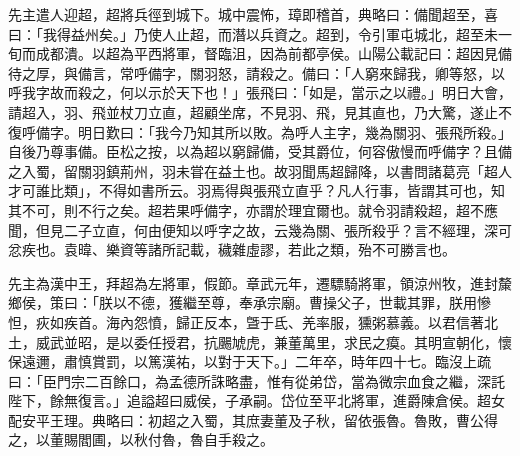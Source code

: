 \begin{pinyinscope}
先主遣人迎超，超將兵徑到城下。城中震怖，璋即稽首，典略曰：備聞超至，喜曰：「我得益州矣。」乃使人止超，而潛以兵資之。超到，令引軍屯城北，超至未一旬而成都潰。以超為平西將軍，督臨沮，因為前都亭侯。山陽公載記曰：超因見備待之厚，與備言，常呼備字，關羽怒，請殺之。備曰：「人窮來歸我，卿等怒，以呼我字故而殺之，何以示於天下也！」張飛曰：「如是，當示之以禮。」明日大會，請超入，羽、飛並杖刀立直，超顧坐席，不見羽、飛，見其直也，乃大驚，遂止不復呼備字。明日歎曰：「我今乃知其所以敗。為呼人主字，幾為關羽、張飛所殺。」自後乃尊事備。臣松之按，以為超以窮歸備，受其爵位，何容傲慢而呼備字？且備之入蜀，留關羽鎮荊州，羽未甞在益土也。故羽聞馬超歸降，以書問諸葛亮「超人才可誰比類」，不得如書所云。羽焉得與張飛立直乎？凡人行事，皆謂其可也，知其不可，則不行之矣。超若果呼備字，亦謂於理宜爾也。就令羽請殺超，超不應聞，但見二子立直，何由便知以呼字之故，云幾為關、張所殺乎？言不經理，深可忿疾也。袁暐、樂資等諸所記載，穢雜虛謬，若此之類，殆不可勝言也。

先主為漢中王，拜超為左將軍，假節。章武元年，遷驃騎將軍，領涼州牧，進封斄鄉侯，策曰：「朕以不德，獲繼至尊，奉承宗廟。曹操父子，世載其罪，朕用慘怛，疢如疾首。海內怨憤，歸正反本，曁于氐、羌率服，獯粥慕義。以君信著北土，威武並昭，是以委任授君，抗颺虓虎，兼董萬里，求民之瘼。其明宣朝化，懷保遠邇，肅慎賞罰，以篤漢祐，以對于天下。」二年卒，時年四十七。臨沒上疏曰：「臣門宗二百餘口，為孟德所誅略盡，惟有從弟岱，當為微宗血食之繼，深託陛下，餘無復言。」追謚超曰威侯，子承嗣。岱位至平北將軍，進爵陳倉侯。超女配安平王理。典略曰：初超之入蜀，其庶妻董及子秋，留依張魯。魯敗，曹公得之，以董賜閻圃，以秋付魯，魯自手殺之。


\end{pinyinscope}